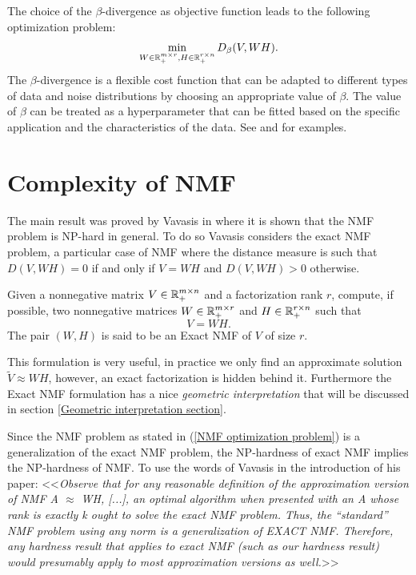 The choice of the $\beta$-divergence as objective function leads to the following optimization problem:
\begin{equation}
    \min_{W \in \mathbb{R}_+^{m \times r}, H \in \mathbb{R}_+^{r \times n}} D_{\beta}(V, WH).
\end{equation}
The $\beta$-divergence is a flexible cost function that can be adapted to different types of data and noise distributions by choosing an appropriate value of $\beta$.
The value of $\beta$ can be treated as a hyperparameter that can be fitted based on the specific application and the characteristics of the data. 
See \cite{fevotte2015nonlinear} and \cite{vincent2009adaptive} for examples. 
\section{Complexity of NMF} \label{complexity of NMF section}
The main result was proved by Vavasis in \cite{vavasis2007complexitynonnegativematrixfactorization} where it is shown that the NMF problem is NP-hard in general.
To do so Vavasis considers the exact NMF problem, a particular case of NMF where the distance measure is such that $D(V, WH) = 0$ if and only if $V = WH$ and $D(V, WH) > 0$ otherwise.
\begin{definition}\label{Exact NMF definition}
      Given a nonnegative matrix $V \in \mathbb{R}^{m\times n}_+$ and a factorization rank $r$,
compute, if possible, two nonnegative matrices
$W \in \mathbb{R}^{m \times r}_+$ and $H \in \mathbb{R}^{r \times n}_+$
such that
\begin{equation}
    V = WH.
\end{equation}
The pair $(W , H)$ is said to be an Exact NMF of $V$ of size $r$.  
\end{definition}
This formulation is very useful, in practice we only find an approximate solution $\tilde{V}\approx WH$, however, an exact factorization is hidden behind it. Furthermore
the Exact NMF formulation has a nice \textit{geometric interpretation} that will be discussed in section \ref{Geometric interpretation section}.
\par
Since the NMF problem as stated in (\ref{NMF optimization problem}) is a generalization of the exact NMF problem, the NP-hardness of exact NMF implies the NP-hardness of NMF.
To use the words of Vavasis \cite{vavasis2007complexitynonnegativematrixfactorization} in the introduction of his paper:
{<<\textit{Observe that for any reasonable definition of the approximation version of NMF A $\approx$ WH, [...], an optimal algorithm when presented with an
A whose rank is exactly k ought to solve the exact NMF problem. Thus, the ``standard''
NMF problem using any norm is a generalization of EXACT NMF. Therefore, any hardness result that applies to exact NMF (such as our hardness result) would presumably
apply to most approximation versions as well.}>>}
